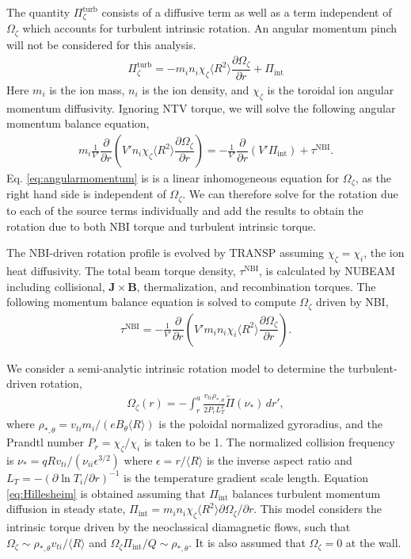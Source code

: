 \documentclass[aip, pop, preprint]{revtex4-1}
\numberwithin{figure}{section}
\numberwithin{equation}{section}
\newcommand{\partder}[2]{\dfrac{\partial  #1}{\partial  #2}} %
\begin{document}
The quantity $\Pi_{\zeta}^{\text{turb}}$ consists of a diffusive term as well as a term independent of $\Omega_{\zeta}$ which accounts for turbulent intrinsic rotation. An angular momentum pinch will not be considered for this analysis. 
\begin{gather}
\Pi_{\zeta}^{\text{turb}} = -m_i n_i \chi_{\zeta} \langle R^2 \rangle \partder{\Omega_{\zeta}}{r} + \Pi_{\text{int}}
\end{gather}
Here $m_i$ is the ion mass, $n_i$ is the ion density, and $\chi_{\zeta}$ is the toroidal ion angular momentum diffusivity. Ignoring NTV torque, we will solve the following angular momentum balance equation,
\begin{gather}
m_i \frac{1}{V'} \partder{}{r} \left( V' n_i \chi_{\zeta} \langle R^2 \rangle \partder{\Omega_{\zeta}}{r} \right) =  -\frac{1}{V'} \partder{}{r} \left( V' \Pi_{\text{int}} \right) + \tau^{\text{NBI}}.
\label{eq:angularmomentum}
\end{gather}
Eq. \ref{eq:angularmomentum} is is a linear inhomogeneous equation for $\Omega_{\zeta}$, as the right hand side is independent of $\Omega_{\zeta}$. We can therefore solve for the rotation due to each of the source terms individually and add the results to obtain the rotation due to both NBI torque and turbulent intrinsic torque. 

The NBI-driven rotation profile is evolved by TRANSP assuming $\chi_{\zeta} = \chi_{i}$, the ion heat diffusivity. The total beam torque density, $\tau^{\text{NBI}}$, is calculated by NUBEAM including collisional, $\bm{J} \times \bm{B}$, thermalization, and recombination torques. The following momentum balance equation is solved to compute $\Omega_{\zeta}$ driven by NBI,
\begin{gather}
\tau^{\text{NBI}} = -\frac{1}{V'} \partder{}{r} \left( V' m_i n_i \chi_{i} \langle R^2 \rangle \partder{\Omega_{\zeta}}{r} \right).
\end{gather} 

We consider a semi-analytic intrinsic rotation model to determine the turbulent-driven rotation,\cite{Hillesheim2015}
\begin{gather}
\Omega_{\zeta}(r) = - \int_{r}^a \frac{v_{ti} \rho_{*,\theta}} {2 P_r L_T^2} \widetilde{\Pi} (\nu_*) \, d r',
\label{eq:Hillesheim}
\end{gather} 
where $\rho_{*,\theta} = v_{ti} m_i/(e B_{\theta} \langle R \rangle)$ is the poloidal normalized gyroradius, and the Prandtl number $P_r = \chi_{\zeta}/\chi_i$ is taken to be 1. The normalized collision frequency is $\nu_* = q R v_{ti}/(\nu_{ii} \epsilon^{3/2})$ where $\epsilon = r/\langle R \rangle$ is the inverse aspect ratio and $L_T = - \left( \partial \ln T_i/ \partial r \right)^{-1}$ is the temperature gradient scale length. Equation \ref{eq:Hillesheim} is obtained assuming that $\Pi_{\text{int}}$ balances turbulent momentum diffusion in steady state, $\Pi_{\text{int}} = m_i n_i \chi_{\zeta} \langle R^2 \rangle \partial \Omega_{\zeta}/\partial r$. This model considers the intrinsic torque driven by the neoclassical diamagnetic flows, such that $\Omega_{\zeta} \sim \rho_{*,\theta} v_{ti}/\langle R \rangle$ and $\Omega_{\zeta} \Pi_{\text{int}}/Q \sim \rho_{*, \theta}$. It is also assumed that $\Omega_{\zeta} = 0$ at the wall. 
\end{document}

